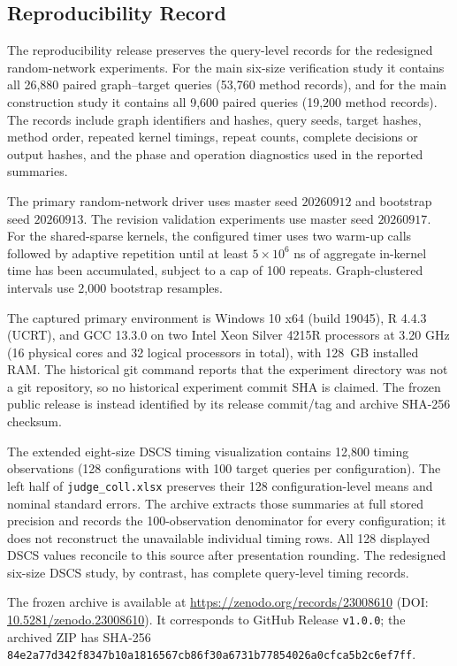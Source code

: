 \newcommand{\ExperimentArchiveURL}{https://zenodo.org/records/23008610}
\newcommand{\ExperimentArchiveDOI}{10.5281/zenodo.23008610}

\subsection{Reproducibility Record}
\label{app:reproducibility-record-detail}

The reproducibility release preserves the query-level records for the
redesigned random-network experiments. For the main six-size verification
study it contains all 26,880 paired graph--target queries (53,760 method
records), and for the main construction study it contains all 9,600 paired
queries (19,200 method records). The records include graph identifiers and
hashes, query seeds, target hashes, method order, repeated kernel timings,
repeat counts, complete decisions or output hashes, and the phase and
operation diagnostics used in the reported summaries.

The primary random-network driver uses master seed \(20260912\) and
bootstrap seed \(20260913\). The revision validation experiments use master
seed \(20260917\). For the shared-sparse kernels, the configured timer uses
two warm-up calls followed by adaptive repetition until at least
\(5\times10^6\) ns of aggregate in-kernel time has been accumulated, subject
to a cap of 100 repeats. Graph-clustered intervals use 2,000 bootstrap
resamples.

The captured primary environment is Windows 10 x64 (build 19045), R 4.4.3
(UCRT), and GCC 13.3.0 on two Intel Xeon Silver 4215R processors at
3.20 GHz (16 physical cores and 32 logical processors in total), with
128~GB installed RAM. The historical git command reports that the experiment
directory was not a git repository, so no historical experiment commit SHA is
claimed. The frozen public release is instead identified by its release
commit/tag and archive SHA-256 checksum.

The extended eight-size DSCS timing visualization contains 12,800 timing
observations (128 configurations with 100 target queries per configuration).
The left half of \texttt{judge\_coll.xlsx} preserves their 128
configuration-level means and nominal standard errors. The archive extracts
those summaries at full stored precision and records the 100-observation
denominator for every configuration; it does not reconstruct the unavailable
individual timing rows. All 128 displayed DSCS values reconcile to this source
after presentation rounding. The redesigned six-size DSCS study, by contrast,
has complete query-level timing records.

The frozen archive is available at \url{\ExperimentArchiveURL}
(DOI: \href{https://doi.org/\ExperimentArchiveDOI}{\ExperimentArchiveDOI}).
It corresponds to GitHub Release \texttt{v1.0.0}; the archived ZIP has
SHA-256
\texttt{84e2a77d342f8347b10a1816567cb86f30a6731b77854026a0cfca5b2c6ef7ff}.
